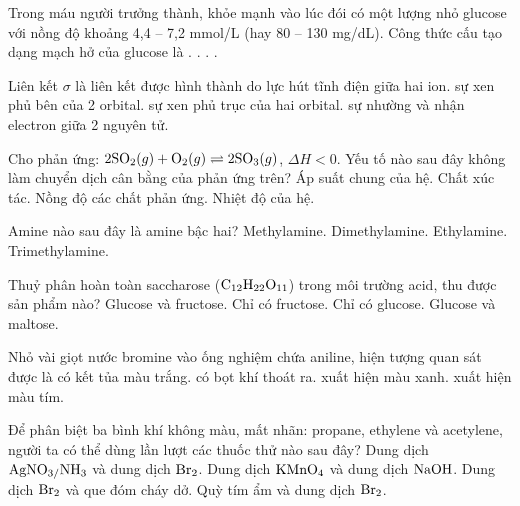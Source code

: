 \documentclass[11pt,a4paper]{article}
\begin{document}
\begin{ex}
Trong máu người trưởng thành, khỏe mạnh vào lúc đói có một lượng nhỏ glucose với nồng độ khoảng 4,4 – 7,2 mmol/L (hay 80 – 130 mg/dL). Công thức cấu tạo dạng mạch hở của glucose là
\choice
{\True {}.}
{.}
{.}
{.}

\end{ex}

\begin{ex}
Liên kết $\sigma$ là liên kết được hình thành do
\choice
{lực hút tĩnh điện giữa hai ion.}
{sự xen phủ bên của 2 orbital.}
{\True sự xen phủ trục của hai orbital.}
{sự nhường và nhận electron giữa 2 nguyên tử.}

\end{ex}

\begin{ex}
Cho phản ứng: $2\ce{SO2}(g) + \ce{O2}(g) \rightleftharpoons 2\ce{SO3}(g)$, $\Delta H < 0$. Yếu tố nào sau đây không làm chuyển dịch cân bằng của phản ứng trên?
\choice
{Áp suất chung của hệ.}
{\True Chất xúc tác.}
{Nồng độ các chất phản ứng.}
{Nhiệt độ của hệ.}

\end{ex}

\begin{ex}
Amine nào sau đây là amine bậc hai?
\choice
{Methylamine.}
{\True Dimethylamine.}
{Ethylamine.}
{Trimethylamine.}

\end{ex}

\begin{ex}
Thuỷ phân hoàn toàn saccharose ($\ce{C12H22O11}$) trong môi trường acid, thu được sản phẩm nào?
\choice
{\True Glucose và fructose.}
{Chỉ có fructose.}
{Chỉ có glucose.}
{Glucose và maltose.}

\end{ex}

\begin{ex}
Nhỏ vài giọt nước bromine vào ống nghiệm chứa aniline, hiện tượng quan sát được là
\choice
{\True có kết tủa màu trắng.}
{có bọt khí thoát ra.}
{xuất hiện màu xanh.}
{xuất hiện màu tím.}

\end{ex}

\begin{ex}
Để phân biệt ba bình khí không màu, mất nhãn: propane, ethylene và acetylene, người ta có thể dùng lần lượt các thuốc thử nào sau đây?
\choice
{\True Dung dịch $\ce{AgNO3/NH3}$ và dung dịch $\ce{Br2}$.}
{Dung dịch $\ce{KMnO4}$ và dung dịch $\ce{NaOH}$.}
{Dung dịch $\ce{Br2}$ và que đóm cháy dở.}
{Quỳ tím ẩm và dung dịch $\ce{Br2}$.}

\end{ex}
\end{document}

